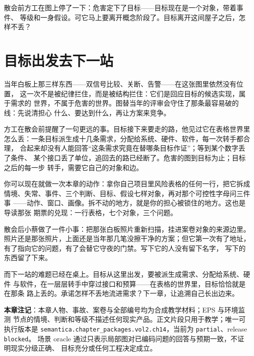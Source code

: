 散会前方工在图上停了一下：危害定下了目标——目标现在是一个对象，带着事件、
等级和一身假设。可它马上要离开概念阶段了。目标离开这间屋子之后，怎样不丢？

\section{目标出发去下一站}

当年白板上那三样东西——双信号比较、关断、告警——在这张图里依然没有位置，
这一次不是被纪律拦住，而是被结构拦住：它们是回应目标的候选实现，属于需求的
世界，不属于危害的世界。图替当年的评审会守住了那条最容易破的线：先说清担心
什么、要达到什么，再让方案来竞争。

方工在散会前提醒了一句更远的事。目标接下来要走的路，他见过它在表格世界里
怎么丢：一条目标派生成十几条需求，分配给系统、硬件、软件，每一次转手都合理，
合起来却没有人能回答“这条需求究竟在替哪条目标作证”；等到某个数字丢了条件、
某个接口丢了单位，追回去的路已经断了。危害的图到目标为止；目标之后的每一步
转手，需要它自己的对象和边。

你可以现在就做一次本章的动作：拿你自己项目里风险表格的任何一行，把它拆成
情境、失常、事件、三个判断、目标、假设七样对象，再对那个可控性字母问三件事
——动作、窗口、画像。拆不动的地方，就是你的担心被锁住的地方。这也是导读那张
期票的兑现：一行表格，七个对象，三个问题。

散会后小蔡做了一件小事：把那张白板照片重新扫描，挂进案卷对象的来源边里。
照片还是那张照片，上面还是当年那几笔没擦干净的方案；但它第一次有了地址，
有了指向它的问题，有了会替它守夜的门禁。写下它的人没有留下名字，
写下的东西留了下来。

而下一站的难题已经在桌上。目标从这里出发，要被派生成需求、分配给系统、硬件
与软件，在一层层转手中穿过接口和预算——在表格的世界里，目标恰恰就是在那条
路上丢的。承诺怎样不丢地流进需求？下一章，让追溯自己长出边来。


\begin{noteblock}
\textbf{本章注记}：本章人物、事故、案卷与全部编号均为合成教学材料；EPS 与环境监测
节点的情境、判断和等级不描述任何现实产品。正文片段只用于教学；唯一可执行版本是
\nolinkurl{semantica.chapter_packages.vol2.ch14}，当前为 \nolinkurl{partial}、release \nolinkurl{blocked}。
场景 oracle 通过只表示局部图对已编码问题的回答与预期一致，不证明现实分级正确、
目标充分或任何工程决定成立。
\end{noteblock}
